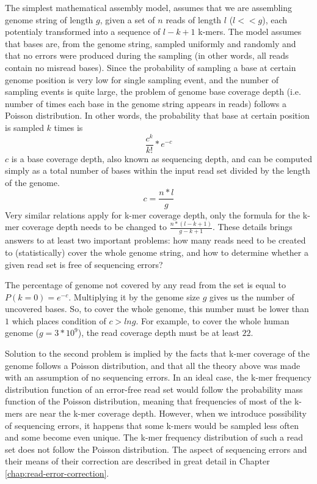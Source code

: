 The simplest mathematical assembly model, assumes that we are assembling genome string of length $g$, given a set of $n$ reads of length $l$ ($l << g$), each potentialy transformed into a sequence of $l-k+1$ k-mers. The model assumes that bases are, from the genome string, sampled uniformly and randomly and that no errors were produced during the sampling (in other words, all reads contain no misread bases). Since the probability of sampling a base at certain genome position is very low for single sampling event, and the number of sampling events is quite large, the problem of genome base coverage depth (i.e. number of times each base in the genome string appears in reads) follows a Poisson distribution. In other words, the probability that base at certain position is sampled $k$ times is
$$
\frac{c^k}{k!}*e^{-c}
$$
$c$ is a base coverage depth, also known as sequencing depth, and can be computed simply as a total number of bases within the input read set divided by the length of the genome.
$$
c = \frac{n * l}{g}
$$
Very similar relations apply for k-mer coverage depth, only the formula for the k-mer coverage depth needs to be changed to $\frac{n*(l - k + 1)}{g - k + 1}$. These details brings answers to at least two important problems: how many reads need to be created to (statistically) cover the whole genome string, and how to determine whether a given read set is free of sequencing errors?

The percentage of genome not covered by any read from the set is equal to $P(k=0) = e^{-c}$. Multiplying it by the genome size $g$ gives us the number of uncovered bases. So, to cover the whole genome, this number must be lower than $1$ which places condition of $c > ln g$. For example, to cover the whole human genome ($g = 3 * 10^9$), the read coverage depth must be at least $22$. 

Solution to the second problem is implied by the facts that k-mer coverage of the genome follows a Poisson distribution, and that all the theory above was made with an assumption of no sequencing errors. In an ideal case, the k-mer frequency distribution function of an error-free read set would follow the probability mass function of the Poisson distribution, meaning that frequencies of most of the k-mers are near the k-mer coverage depth. However, when we introduce possibility of sequencing errors, it happens that some k-mers would be sampled less often and some become even unique. The k-mer frequency distribution of such a read set does not follow the Poisson distribution. The aspect of sequencing errors and their means of their correction are described in great detail in Chapter \ref{chap:read-error-correction}.

